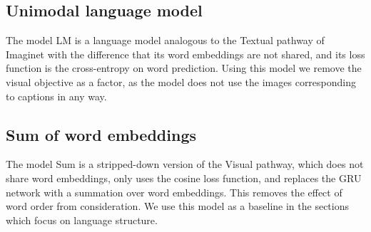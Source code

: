 \subsection{Unimodal language model}
The model {\sc LM} is a language model analogous to the {\sc Textual}
pathway of {\sc Imaginet} with the difference that its word embeddings
are not shared, and its loss function is the cross-entropy on word
prediction. Using this model we remove the visual objective as a
factor, as the model does not use the images corresponding to captions
in any way.

\subsection{Sum of word embeddings}
The model {\sc Sum} is a stripped-down version of the {\sc Visual}
pathway, which does not share word embeddings, only uses the cosine
loss function, and replaces the GRU network with a summation over word
embeddings. This removes the effect of word order from
consideration. We use this model as a baseline in the sections which
focus on language structure.
